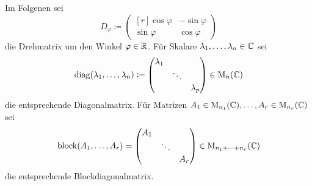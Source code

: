 \documentclass[a4paper, 10pt, numbers=noenddot]{scrartcl}
\begin{document}
Im Folgenen sei
\[
  D_\varphi
  \coloneqq
  \begin{pmatrix*}[r]
    \cos \varphi  & -\sin \varphi \\
    \sin \varphi  &  \cos \varphi
  \end{pmatrix*}
\]
die Drehmatrix um den Winkel $\varphi \in \mathbb{R}$.
Für Skalare $\lambda_1, \dotsc, \lambda_n \in \mathbb{C}$ sei
\[
  \operatorname{\operatorname{diag}}(\lambda_1, \dotsc, \lambda_n)
  \coloneqq
  \begin{pmatrix}
    \lambda_1 &         &           \\
              & \ddots  &           \\
              &         & \lambda_p
  \end{pmatrix}
  \in
  \operatorname{M}_n(\mathbb{C})
\]
die entsprechende Diagonalmatrix.
Für Matrizen $A_1 \in \operatorname{M}_{n_1}(\mathbb{C}), \dotsc, A_r \in \operatorname{M}_{n_r}(\mathbb{C})$ sei
\[
  \operatorname{\operatorname{block}}(A_1, \dotsc, A_r)
  =
  \begin{pmatrix}
    A_1 &         &     \\
        & \ddots  &     \\
        &         & A_r
  \end{pmatrix}
  \in
  \operatorname{M}_{n_1 + \dotsb + n_r}(\mathbb{C})
\]
die entsprechende Blockdiagonalmatrix.
\end{document}
